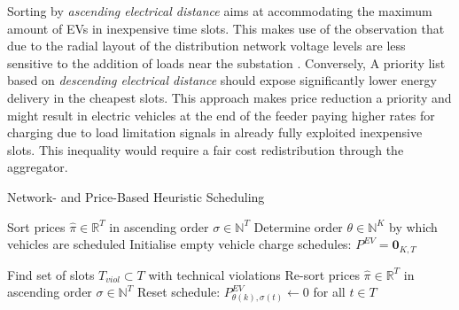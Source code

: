 Sorting by \textit{ascending electrical distance} aims at accommodating the maximum amount of EVs in inexpensive time slots. This makes use of the observation that due to the radial layout of the distribution network voltage levels are less sensitive to the addition of loads near the substation \cite{Richardson2012}. Conversely, A priority list based on \textit{descending electrical distance} should expose significantly lower energy delivery in the cheapest slots. This approach makes price reduction a priority and might result in electric vehicles at the end of the feeder paying higher rates for charging due to load limitation signals in already fully exploited inexpensive slots. This inequality would require a fair cost redistribution through the aggregator.
 
\begin{algorithm}[h]
	\caption{Network- and Price-Based Heuristic Scheduling}
	\label{alg:ncpbh}
	\begin{spacing}{1.2}
	\begin{algorithmic}[1]
		\State Sort prices $\hat{\pi}\in\mathbb{R}^T$ in ascending order $\sigma \in \mathbb{N}^T$
		\State Determine order $\theta\in  \mathbb{N}^K$ by which vehicles are scheduled
		\State Initialise empty vehicle charge schedules: $P^{EV} = \bm{0}_{K,T}$

		
		\EndIf
		\EndWhile
		\EndFor
		
				
		\State Find set of slots $T_{viol}\subset T$ with technical violations
		 
		\State {$\hat{\pi}_\tau \gets \infty$}
		\EndIf
		\EndFor
		\State Re-sort prices $\hat{\pi}\in\mathbb{R}^T$ in ascending order $\sigma \in \mathbb{N}^T$
		\State Reset schedule: $P^{EV}_{{\theta(k)},\sigma(t)} \gets 0$ for all $t \in T$
		\EndIf
		

\end{algorithmic}
\end{spacing}
\end{algorithm}
